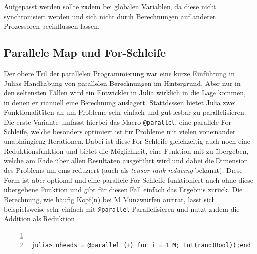 \documentclass[proseminar,german,utf8]{zihpub}
\begin{document}
Aufgepasst werden sollte zudem bei globalen Variablen, da diese nicht synchronisiert werden und sich nicht durch Berechnungen auf anderen Prozessoren beeinflussen lassen.

\subsection{Parallele Map und For-Schleife }

Der obere Teil der parallelen Programmierung war eine kurze Einführung in Julias Handhabung von parallelen Berechnungen im Hintergrund. Aber nur in den seltensten Fällen wird ein Entwickler in Julia wirklich in die Lage kommen, in denen er manuell eine Berechnung auslagert. Stattdessen bietet Julia zwei Funktionalitäten an um Probleme sehr einfach und gut lesbar zu parallelisieren. Die erste Variante umfasst hierbei das Macro \verb|@parallel|, eine parallele For-Schleife, welche besonders optimiert ist für Probleme mit vielen voneinander unabhängieng Iterationen. Dabei ist diese For-Schleife gleichzeitig auch noch eine Reduktionsfunktion und bietet die Möglichkeit, eine Funktion mit zu übergeben, welche am Ende über allen Resultaten ausgeführt wird und dabei die Dimension des Problems um eins reduziert (auch als \textit{tensor-rank-reducing} bekannt). Diese Form ist aber optional und eine parallele For-Schleife funktioniert auch ohne diese übergebene Funktion und gibt für diesen Fall einfach das Ergebnis zurück. Die Berechnung, wie häufig Kopf(n) bei M Münzwürfen auftrat, lässt sich beispielsweise sehr einfach mit \verb|@parallel| Parallelisieren und nutzt zudem die Addition als Reduktion
\begin{Verbatim}[baselinestretch=1,fontsize=\scriptsize,numbers=left,frame=single,stepnumber=5,xleftmargin=1cm,xrightmargin=1cm]

julia> nheads = @parallel (+) for i = 1:M; Int(rand(Bool));end

\end{Verbatim}
\end{document}
